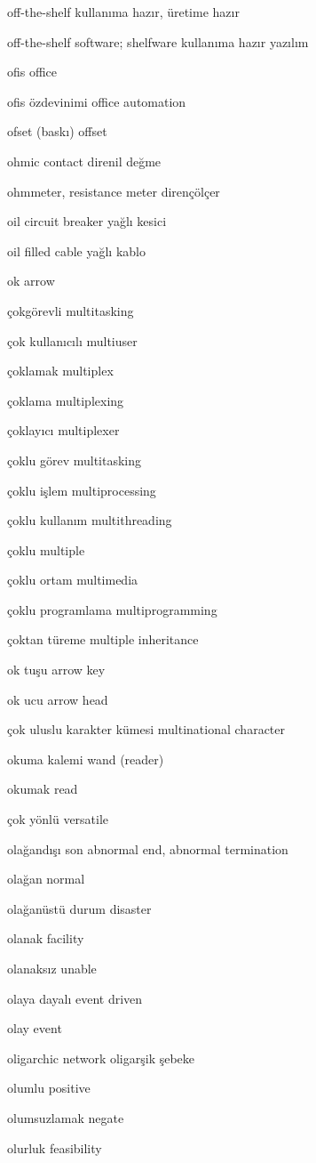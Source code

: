 \documentclass[12pt,fleqn]{article}\usepackage{../../common}
\begin{document}
off-the-shelf kullanıma hazır, üretime hazır

off-the-shelf software; shelfware kullanıma hazır yazılım

ofis office

ofis özdevinimi office automation

ofset (baskı) offset

ohmic contact direnil değme

ohmmeter, resistance meter dirençölçer

oil circuit breaker yağlı kesici

oil filled cable yağlı kablo

ok arrow

çokgörevli multitasking

çok kullanıcılı multiuser

çoklamak multiplex

çoklama multiplexing

çoklayıcı multiplexer

çoklu görev multitasking

çoklu işlem multiprocessing

çoklu kullanım multithreading

çoklu multiple

çoklu ortam multimedia

çoklu programlama multiprogramming

çoktan türeme multiple inheritance

ok tuşu arrow key

ok ucu arrow head

çok uluslu karakter kümesi multinational character

okuma kalemi wand (reader)

okumak read

çok yönlü versatile

olağandışı son abnormal end, abnormal termination

olağan normal

olağanüstü durum disaster

olanak facility

olanaksız unable

olaya dayalı event driven

olay event

oligarchic network oligarşik şebeke

olumlu positive

olumsuzlamak negate

olurluk feasibility
\end{document}
